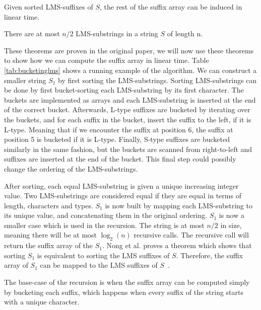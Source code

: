 \begin{theorem}

    Given sorted LMS-suffixes of $S$, the rest of the suffix array can be induced in linear
    time. 

\end{theorem}

\begin{theorem}
    There are at most $n / 2$ LMS-substrings in a string $S$ of length n.
\end{theorem}

These theorems are proven in the original paper, we will now use these theorems to show
how we can compute the suffix array in linear time. Table \ref{tab:bucketinglms} shows a
running example of the algorithm. We can construct a smaller string $S_1$ by first sorting
the LMS-substrings. Sorting LMS-substrings can be done by first bucket-sorting each
LMS-substring by its first character. The buckets are implemented as arrays and each
LMS-substring is inserted at the end of the correct bucket. Afterwards, L-type suffixes
are bucketed by iterating over the buckets, and for each suffix in the bucket, insert the
suffix to the left, if it is L-type. Meaning that if we encounter the suffix at position
6, the suffix at position 5 is bucketed if it is L-type. Finally, S-type suffixes are
bucketed similarly in the same fashion, but the buckets are scanned from right-to-left and
suffixes are inserted at the end of the bucket. This final step could possibly change the
ordering of the LMS-substrings.

After sorting, each equal LMS-substring is given a unique increasing integer value. Two
LMS-substrings are considered equal if they are equal in terms of length, characters and
types. $S_1$ is now built by mapping each LMS-substring to its unique value, and
concatenating them in the original ordering. $S_1$ is now a smaller case which is used in
the recursion. The string is at most $n / 2$ in size, meaning there will be at most
$\log_2(n)$ recursive calls. The recursive call will return the suffix array of the $S_1$.
Nong et al. proves a theorem which shows that sorting $S_1$ is
equivalent to sorting the LMS suffixes of $S$. Therefore, the suffix array of $S_1$ can be
mapped to the LMS suffixes of $S$~\cite{LinearTimeSuffixArraySAIS}.

The base-case of the recursion is when the suffix array can be computed simply by
bucketing each suffix, which happens when every suffix of the string starts with a unique
character. 

